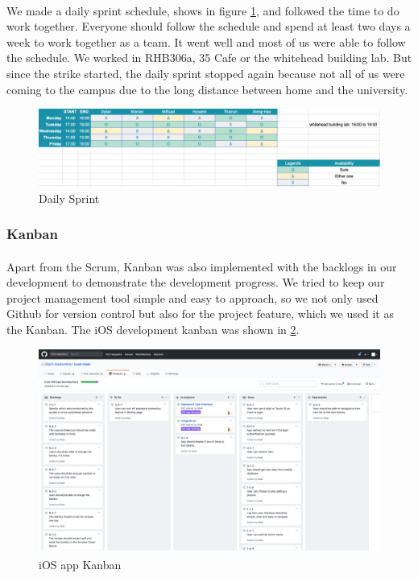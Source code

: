 \documentclass[12pt,a4paper]{article}
\begin{document}
          \paragraph{}We made a daily sprint schedule, shows in figure \ref{fig:Daily Sprint}, and followed the time to do work together. Everyone should follow the schedule and spend at least two days a week to work together as a team. It went well and most of us were able to follow the schedule. We worked in RHB306a, 35 Cafe or the whitehead building lab. But since the strike started, the daily sprint stopped again because not all of us were coming to the campus due to the long distance between home and the university. 

          \begin{figure}[H]
            \centering
            \includegraphics[width=1\textwidth]{../assets/development-records-daily-sprint.png}
            \caption{Daily Sprint}
            \label{fig:Daily Sprint}
          \end{figure}

        \subsubsection{Kanban}
          \paragraph{}Apart from the Scrum, Kanban was also implemented with the backlogs in our development to demonstrate the development progress. We tried to keep our project management tool simple and easy to approach, so we not only used Github for version control but also for the project feature, which we used it as the Kanban. The iOS  development kanban was shown in \ref{fig:iOS Development Kanban}.

          \begin{figure}[H]
            \centering
            \includegraphics[width=1\textwidth]{../assets/development-records-ios-kanban.png}
            \caption{iOS app Kanban}
            \label{fig:iOS Development Kanban}
          \end{figure}
         
\end{document}
